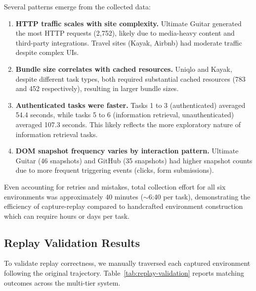 \documentclass[letterpaper]{article}
\begin{document}
Several patterns emerge from the collected data:

\begin{enumerate}
    \item \textbf{HTTP traffic scales with site complexity.} Ultimate Guitar generated the most HTTP requests (2,752), likely due to media-heavy content and third-party integrations. Travel sites (Kayak, Airbnb) had moderate traffic despite complex UIs.
    \item \textbf{Bundle size correlates with cached resources.} Uniqlo and Kayak, despite different task types, both required substantial cached resources (783 and 452 respectively), resulting in larger bundle sizes.
    \item \textbf{Authenticated tasks were faster.} Tasks 1 to 3 (authenticated) averaged 54.4 seconds, while tasks 5 to 6 (information retrieval, unauthenticated) averaged 107.3 seconds. This likely reflects the more exploratory nature of information retrieval tasks.
    \item \textbf{DOM snapshot frequency varies by interaction pattern.} Ultimate Guitar (46 snapshots) and GitHub (35 snapshots) had higher snapshot counts due to more frequent triggering events (clicks, form submissions).
\end{enumerate}

Even accounting for retries and mistakes, total collection effort for all six environments was approximately 40 minutes ($\sim$6:40 per task), demonstrating the efficiency of capture-replay compared to handcrafted environment construction which can require hours or days per task.

\subsection{Replay Validation Results}

To validate replay correctness, we manually traversed each captured environment following the original trajectory. Table~\ref{tab:replay-validation} reports matching outcomes across the multi-tier system.
\end{document}
